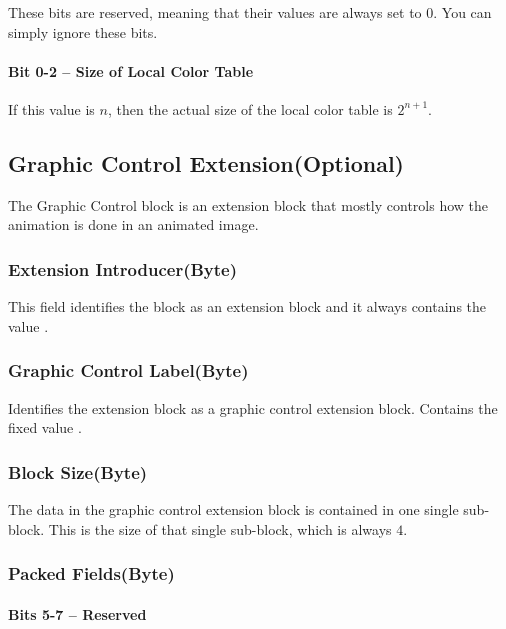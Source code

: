 These bits are reserved, meaning that their values are always set to
$0$. You can simply ignore these bits.

\paragraph{Bit 0-2 -- Size of Local Color Table}

If this value is $n$, then the actual size of the local color table is
$2^{n + 1}$.

\subsection{Graphic Control Extension(Optional)}

The Graphic Control block is an extension block that mostly controls
how the animation is done in an animated \gif image.

\subsubsection{Extension Introducer(Byte)}

This field identifies the block as an extension block and it always
contains the value .

\subsubsection{Graphic Control Label(Byte)}

Identifies the extension block as a graphic control extension
block. Contains the fixed value .

\subsubsection{Block Size(Byte)}

The data in the graphic control extension block is contained in one
single sub-block. This is the size of that single sub-block, which is
always $4$.

\subsubsection{Packed Fields(Byte)}

\paragraph{Bits 5-7 -- Reserved}

